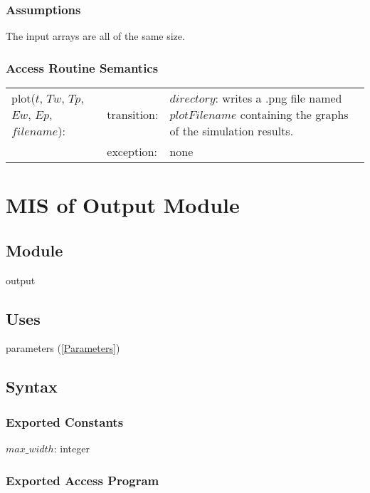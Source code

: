 \documentclass[12pt]{article}
\begin{document}
\subsubsection{Assumptions}

The input arrays are all of the same size.

\subsubsection{Access Routine Semantics}

\begin{center}
\begin{tabular}{l l p{6cm}}
plot($t$, $Tw$, $Tp$, $Ew$, $Ep$, $filename$): & transition: & $directory$: writes a .png file named $plotFilename$ containing the graphs of the simulation results. \\
& exception: & none \\
\end{tabular}
\end{center}

\section{MIS of Output Module} \label{Output}

\subsection{Module}

output

\subsection{Uses}

parameters (\ref{Parameters})

\subsection{Syntax}

\subsubsection{Exported Constants}

$max\_width$: integer

\subsubsection{Exported Access Program}
\end{document}
